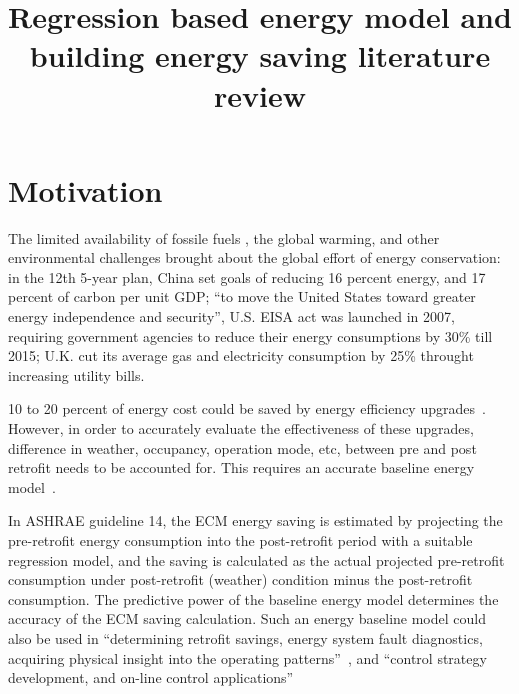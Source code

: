 \documentclass[12pt]{article}
\begin{document}
\title{Regression based energy model and building energy saving literature review}
\maketitle
\tableofcontents
\newpage



\section{Motivation}
The limited availability of fossile fuels \cite{eiaNaturalGas2016,
  greentech2013}, the global warming, and other environmental
challenges brought about the global effort of energy conservation: in
the 12th 5-year plan, China set goals of reducing 16 percent energy,
and 17 percent of carbon per unit GDP; ``to move the United States
toward greater energy independence and security'', U.S. EISA act was
launched in 2007, requiring government agencies to reduce their energy
consumptions by 30\% till 2015; U.K. cut its average gas and
electricity consumption by 25\% throught increasing utility bills.

10 to 20 percent of energy cost could be saved by energy efficiency
upgrades~\cite{doeEngEff2016}. However, in order to accurately
evaluate the effectiveness of these upgrades, difference in weather,
occupancy, operation mode, etc, between pre and post retrofit needs to
be accounted for. This requires an accurate baseline energy
model~\cite{Zhang2015177}. 

In ASHRAE guideline 14, the ECM energy saving is estimated by
projecting the pre-retrofit energy consumption into the post-retrofit
period with a suitable regression model, and the saving is calculated
as the actual projected pre-retrofit consumption under post-retrofit
(weather) condition minus the post-retrofit consumption. The
predictive power of the baseline energy model determines the accuracy
of the ECM saving calculation. Such an energy baseline model could
also be used in ``determining retrofit savings, energy system fault
diagnostics, acquiring physical insight into the operating
patterns''~\cite{Zhang2015177}, and ``control strategy development, and
on-line control applications''~\cite{Zhang2015177}
\end{document}
